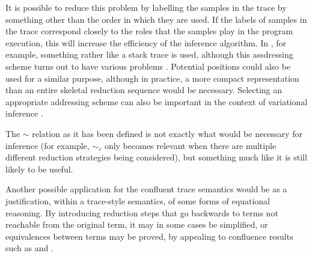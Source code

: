 It is possible to reduce this problem by labelling the samples in the trace by something other than the order in which they are used. If the labels of samples in the trace correspond closely to the roles that the samples play in the program execution, this will increase the efficiency of the inference algorithm. 
In \cite{wingate2011lightweight}, for example, something rather like a stack trace is used, although this assdressing scheme turns out to have various problems \cite{kiselyov2016problems,Hur2015a}. 
Potential positions could also be used for a similar purpose, although in practice, a more compact representation than an entire skeletal reduction sequence would be necessary. 
Selecting an appropriate addressing scheme can also be important in the context of variational inference \cite[\S 6.2.2]{paige2016automatic}.

The $\sim$ relation as it has been defined is not exactly what would be necessary for inference (for example, $\sim_c$ only becomes relevant when there are multiple different reduction strategies being considered), but something much like it is still likely to be useful.

\medskip

Another possible application for the confluent trace semantics would be as a justification, within a trace-style semantics, of some forms of equational reasoning. 
By introducing reduction steps that go backwards to terms not reachable from the original term, it may in some cases be simplified, or equivalences between terms may be proved, by appealing to confluence results such as  and .
 
